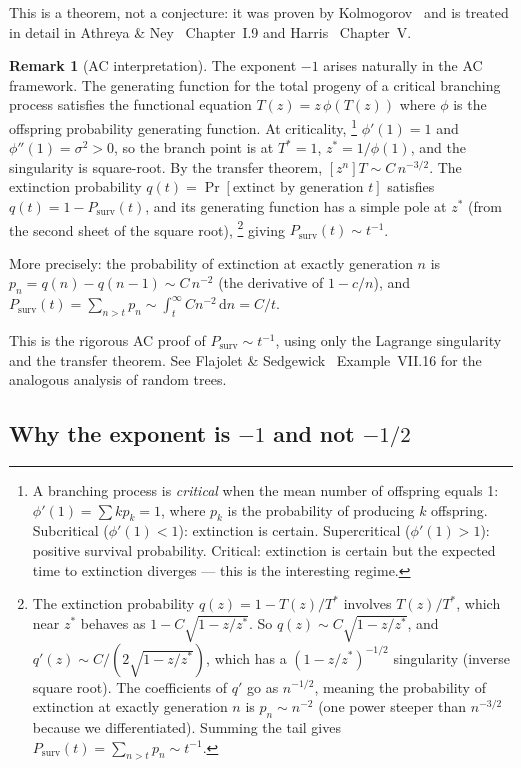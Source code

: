 \documentclass[11pt,a4paper]{article}
\theoremstyle{definition}
\newtheorem*{remark}{Remark}
\newcommand{\dd}{\mathrm{d}}
\newcommand{\Psurv}{P_{\mathrm{surv}}}
\begin{document}
This is a theorem, not a conjecture: it was proven by
Kolmogorov~\cite{kolmogorov1938} and is treated in detail in
Athreya \& Ney~\cite{athreyney1972} Chapter~I.9 and
Harris~\cite{harris1963} Chapter~V.

\begin{remark}[AC interpretation]
The exponent $-1$ arises naturally in the AC framework.
The generating function for the total progeny of a critical branching
process satisfies the functional equation $T(z) = z\,\phi(T(z))$ where
$\phi$ is the offspring probability generating function. At criticality,%
\footnote{A branching process is \emph{critical} when the mean number
of offspring equals 1: $\phi'(1) = \sum k p_k = 1$, where $p_k$ is the
probability of producing $k$ offspring. Subcritical ($\phi'(1) < 1$):
extinction is certain. Supercritical ($\phi'(1) > 1$): positive survival
probability. Critical: extinction is certain but the expected time to
extinction diverges --- this is the interesting regime.}
$\phi'(1) = 1$ and $\phi''(1) = \sigma^2 > 0$, so the branch point is at
$T^* = 1$, $z^* = 1/\phi(1)$, and the singularity is square-root.
By the transfer theorem, $[z^n]T \sim C\, n^{-3/2}$.
The extinction probability $q(t) = \Pr[\text{extinct by generation } t]$
satisfies $q(t) = 1 - \Psurv(t)$, and its generating function has a
simple pole at $z^*$ (from the second sheet of the square root),%
\footnote{The extinction probability $q(z) = 1 - T(z)/T^*$ involves
$T(z)/T^*$, which near $z^*$ behaves as $1 - C\sqrt{1 - z/z^*}$.
So $q(z) \sim C\sqrt{1 - z/z^*}$, and $q'(z) \sim C/(2\sqrt{1 - z/z^*})$,
which has a $(1-z/z^*)^{-1/2}$ singularity (inverse square root).
The coefficients of $q'$ go as $n^{-1/2}$, meaning the probability of
extinction at exactly generation $n$ is $p_n \sim n^{-2}$ (one power
steeper than $n^{-3/2}$ because we differentiated). Summing the tail
gives $\Psurv(t) = \sum_{n>t} p_n \sim t^{-1}$.}
giving $\Psurv(t) \sim t^{-1}$.

More precisely: the probability of extinction at exactly generation $n$
is $p_n = q(n) - q(n{-}1) \sim C\, n^{-2}$ (the derivative of $1 - c/n$),
and $\Psurv(t) = \sum_{n>t} p_n \sim \int_t^\infty C n^{-2}\,\dd n = C/t$.

This is the rigorous AC proof of $\Psurv \sim t^{-1}$, using only the
Lagrange singularity and the transfer theorem.
See Flajolet \& Sedgewick~\cite{flajolet2009} Example~VII.16 for the
analogous analysis of random trees.
\end{remark}

\subsection{Why the exponent is $-1$ and not $-1/2$}
\end{document}
